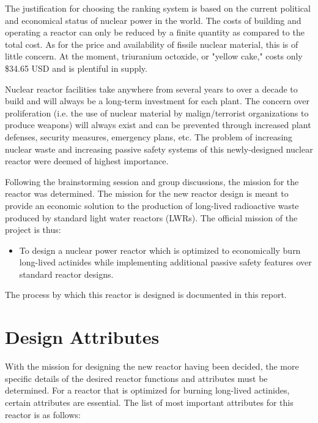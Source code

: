 \documentclass[]{report}
\begin{document}
The justification for choosing the ranking system is based on the current political and economical status of nuclear power in the world.  
The costs of building and operating a reactor can only be reduced by a finite quantity as compared to the total cost.  
As for the price and availability of fissile nuclear material, this is of little concern.
At the moment, triuranium octoxide, or "yellow cake," costs only \$34.65 USD and is plentiful in supply.  

Nuclear reactor facilities take anywhere from several years to over a decade to build and will always be a long-term investment for each plant.  
The concern over proliferation (i.e. the use of nuclear material by malign/terrorist organizations to produce weapons) will always exist and can be prevented through increased plant defenses, security measures, emergency plans, etc.  
The problem of increasing nuclear waste and increasing passive safety systems of this newly-designed nuclear reactor were deemed of highest importance.

Following the brainstorming session and group discussions, the mission for the reactor was determined.
The mission for the new reactor design is meant to provide an economic solution to the production of long-lived radioactive waste produced by standard light water reactors (LWRs).  The official mission of the project is thus:
\begin{itemize} 
  \item To design a nuclear power reactor which is optimized to economically burn long-lived actinides while implementing additional passive safety features over standard reactor designs.
\end{itemize}

The process by which this reactor is designed is documented in this report.

\section{Design Attributes}
With the mission for designing the new reactor having been decided, the more specific details of the desired reactor functions and attributes must be determined.
For a reactor that is optimized for burning long-lived actinides, certain attributes are essential.
The list of most important attributes for this reactor is as follows:
\end{document}
